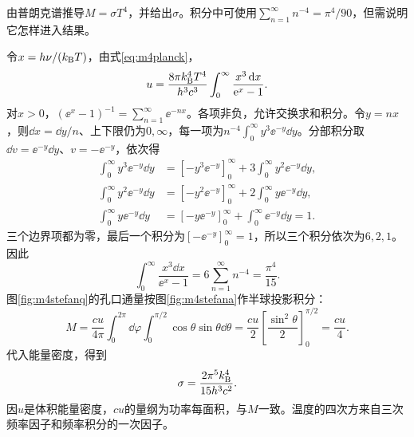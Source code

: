 \begin{example}\label{ex:m4stefan}
由普朗克谱推导$M=\sigma T^4$，并给出$\sigma$。积分中可使用$\sum_{n=1}^\infty n^{-4}=\pi^4/90$，但需说明它怎样进入结果。
\end{example}
\begin{solution}
令$x=h\nu/(k_{\mathrm B} T)$，由式\eqref{eq:m4planck}，
\[
 u=\frac{8\pi k_{\mathrm B}^4T^4}{h^3c^3}\int_0^\infty\frac{x^3\mathop{}\!\mathrm d x}{\mathrm e^x-1}.
\]
对$x>0$，$(\ee^x-1)^{-1}=\sum_{n=1}^\infty\ee^{-nx}$。各项非负，允许交换求和积分。令$y=nx$，则$\dd x=\dd y/n$、上下限仍为$0,\infty$，每一项为$n^{-4}\int_0^\infty y^3\ee^{-y}\dd y$。分部积分取$\dd v=\ee^{-y}\dd y$、$v=-\ee^{-y}$，依次得
\begin{align*}
 \int_0^\infty y^3\ee^{-y}\dd y
 &=[-y^3\ee^{-y}]_0^\infty+3\int_0^\infty y^2\ee^{-y}\dd y,\\
 \int_0^\infty y^2\ee^{-y}\dd y
 &=[-y^2\ee^{-y}]_0^\infty+2\int_0^\infty y\ee^{-y}\dd y,\\
 \int_0^\infty y\ee^{-y}\dd y
 &=[-y\ee^{-y}]_0^\infty+\int_0^\infty\ee^{-y}\dd y=1.
\end{align*}
三个边界项都为零，最后一个积分为$[-\ee^{-y}]_0^\infty=1$，所以三个积分依次为$6,2,1$。因此
\[
 \int_0^\infty\frac{x^3\dd x}{\ee^x-1}=6\sum_{n=1}^\infty n^{-4}=\frac{\pi^4}{15}.
\]
图\ref{fig:m4stefanq}的孔口通量按图\ref{fig:m4stefana}作半球投影积分：
\[
 M=\frac{cu}{4\pi}\int_0^{2\pi}\dd\varphi
 \int_0^{\pi/2}\cos\theta\sin\theta\dd\theta
 =\frac{cu}{2}\left[\frac{\sin^2\theta}{2}\right]_0^{\pi/2}
 =\frac{cu}{4}.
\]
代入能量密度，得到
\[
 \sigma=\frac{2\pi^5k_{\mathrm B}^4}{15h^3c^2}.
\]
因$u$是体积能量密度，$cu$的量纲为功率每面积，与$M$一致。温度的四次方来自三次频率因子和频率积分的一次因子。
\end{solution}

